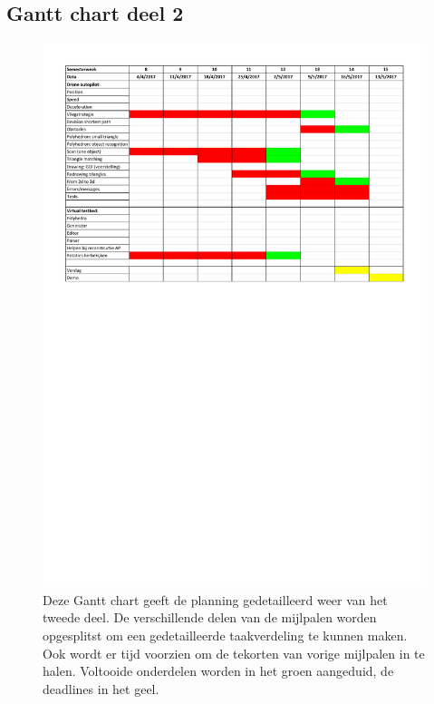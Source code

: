 \subsection{Gantt chart deel 2} 
	\begin{figure}[H]
		\begin{center}
			\includegraphics[scale=0.65]{Appendices/Planning_Deel2.pdf}
		\end{center}
		\caption{Deze Gantt chart geeft de planning gedetailleerd weer van het tweede deel. De verschillende delen van de mijlpalen worden opgesplitst om een gedetailleerde taakverdeling te kunnen maken. Ook wordt er tijd voorzien om de tekorten van vorige mijlpalen in te halen. Voltooide onderdelen worden in het groen aangeduid, de deadlines in het geel.}
	\end{figure}